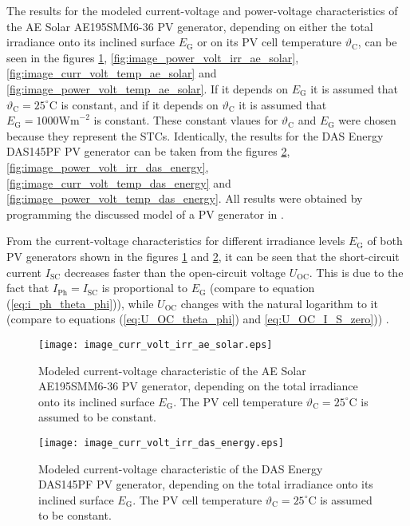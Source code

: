 The results for the modeled current-voltage and power-voltage characteristics of the AE Solar AE195SMM6-36 PV generator, depending on either the total irradiance onto its inclined surface $E_\mathrm{G}$ or on its PV cell temperature $\vartheta_\mathrm{C}$, can be seen in the figures \ref{fig:image_curr_volt_irr_ae_solar}, \ref{fig:image_power_volt_irr_ae_solar}, \ref{fig:image_curr_volt_temp_ae_solar} and \ref{fig:image_power_volt_temp_ae_solar}. If it depends on $E_\mathrm{G}$ it is assumed that $\vartheta_\mathrm{C} = 25^\circ\mathrm{C}$ is constant, and if it depends on $\vartheta_\mathrm{C}$ it is assumed that $E_\mathrm{G} = 1000\mathrm{Wm}^{-2}$ is constant. These constant vlaues for $\vartheta_\mathrm{C}$ and $E_\mathrm{G}$ were chosen because they represent the STCs. Identically, the results for the DAS Energy DAS145PF PV generator can be taken from the figures \ref{fig:image_curr_volt_irr_das_energy}, \ref{fig:image_power_volt_irr_das_energy}, \ref{fig:image_curr_volt_temp_das_energy} and \ref{fig:image_power_volt_temp_das_energy}. All results were obtained by programming the discussed model of a PV generator in \MATLAB.

From the current-voltage characteristics for different irradiance levels $E_\mathrm{G}$ of both PV generators shown in the figures \ref{fig:image_curr_volt_irr_ae_solar} and \ref{fig:image_curr_volt_irr_das_energy}, it can be seen that the short-circuit current $I_\mathrm{SC}$ decreases faster than the open-circuit voltage $U_\mathrm{OC}$. This is due to the fact that $I_\mathrm{Ph} = I_\mathrm{SC}$ is proportional to $E_\mathrm{G}$ (compare to equation (\ref{eq:i_ph_theta_phi})), while $U_\mathrm{OC}$ changes with the natural logarithm to it (compare to equations (\ref{eq:U_OC_theta_phi}) and \ref{eq:U_OC_I_S_zero})) \cite{Mertens:2015}.
\begin{figure}[h!]
	\centering
  	\texttt{[image: image\_curr\_volt\_irr\_ae\_solar.eps]}
  	\caption{Modeled current-voltage characteristic of the AE Solar AE195SMM6-36 PV generator, depending on the total irradiance onto its inclined surface $E_\mathrm{G}$. The PV cell temperature $\vartheta_\mathrm{C} = 25^\circ\mathrm{C}$ is assumed to be constant.}
	\label{fig:image_curr_volt_irr_ae_solar}
\end{figure}
\begin{figure}[h!]
	\centering
  	\texttt{[image: image\_curr\_volt\_irr\_das\_energy.eps]}
  	\caption{Modeled current-voltage characteristic of the DAS Energy DAS145PF PV generator, depending on the total irradiance onto its inclined surface $E_\mathrm{G}$. The PV cell temperature $\vartheta_\mathrm{C} = 25^\circ\mathrm{C}$ is assumed to be constant.}
	\label{fig:image_curr_volt_irr_das_energy}
\end{figure}

